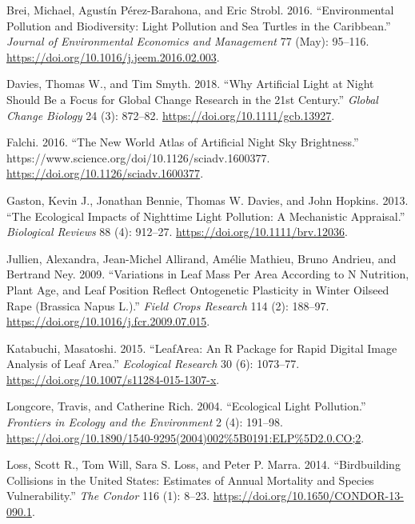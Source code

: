 \documentclass[
]{article}
\newlength{\cslhangindent}
\newlength{\cslentryspacingunit} %
\newenvironment{CSLReferences}[2] %
 {%
  \setlength{\parindent}{0pt}
  \ifodd #1
  \let\oldpar\par
  \def\par{\hangindent=\cslhangindent\oldpar}
  \fi
  \setlength{\parskip}{#2\cslentryspacingunit}
 }%
 {}
\begin{document}
\begin{CSLReferences}{1}{0}
\leavevmode{}%
Brei, Michael, Agustín Pérez-Barahona, and Eric Strobl. 2016.
{``Environmental Pollution and Biodiversity: {Light} Pollution and Sea
Turtles in the {Caribbean}.''} \emph{Journal of Environmental Economics
and Management} 77 (May): 95--116.
\url{https://doi.org/10.1016/j.jeem.2016.02.003}.

\leavevmode{}%
Davies, Thomas W., and Tim Smyth. 2018. {``Why Artificial Light at Night
Should Be a Focus for Global Change Research in the 21st Century.''}
\emph{Global Change Biology} 24 (3): 872--82.
\url{https://doi.org/10.1111/gcb.13927}.

\leavevmode{}%
Falchi. 2016. {``The New World Atlas of Artificial Night Sky
Brightness.''} https://www.science.org/doi/10.1126/sciadv.1600377.
\url{https://doi.org/10.1126/sciadv.1600377}.

\leavevmode{}%
Gaston, Kevin J., Jonathan Bennie, Thomas W. Davies, and John Hopkins.
2013. {``The Ecological Impacts of Nighttime Light Pollution: A
Mechanistic Appraisal.''} \emph{Biological Reviews} 88 (4): 912--27.
\url{https://doi.org/10.1111/brv.12036}.

\leavevmode{}%
Jullien, Alexandra, Jean-Michel Allirand, Amélie Mathieu, Bruno Andrieu,
and Bertrand Ney. 2009. {``Variations in Leaf Mass Per Area According to
{N} Nutrition, Plant Age, and Leaf Position Reflect Ontogenetic
Plasticity in Winter Oilseed Rape ({Brassica} Napus {L}.).''}
\emph{Field Crops Research} 114 (2): 188--97.
\url{https://doi.org/10.1016/j.fcr.2009.07.015}.

\leavevmode{}%
Katabuchi, Masatoshi. 2015. {``{LeafArea}: An {R} Package for Rapid
Digital Image Analysis of Leaf Area.''} \emph{Ecological Research} 30
(6): 1073--77. \url{https://doi.org/10.1007/s11284-015-1307-x}.

\leavevmode{}%
Longcore, Travis, and Catherine Rich. 2004. {``Ecological Light
Pollution.''} \emph{Frontiers in Ecology and the Environment} 2 (4):
191--98.
\url{https://doi.org/10.1890/1540-9295(2004)002\%5B0191:ELP\%5D2.0.CO;2}.

\leavevmode{}%
Loss, Scott R., Tom Will, Sara S. Loss, and Peter P. Marra. 2014.
{``Bird\textendash building Collisions in the {United States}:
{Estimates} of Annual Mortality and Species Vulnerability.''} \emph{The
Condor} 116 (1): 8--23. \url{https://doi.org/10.1650/CONDOR-13-090.1}.


\end{CSLReferences}
\end{document}
